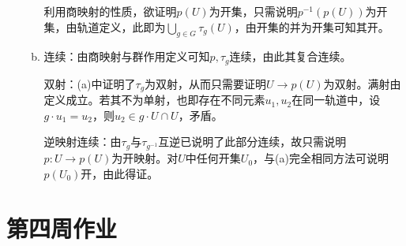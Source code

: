 \documentclass[a4paper,UTF8,fontset=windows]{ctexart}
\begin{document}
\begin{enumerate}[(1)]
\begin{enumerate}[(a)]
    利用商映射的性质，欲证明$p(U)$为开集，只需说明$p^{-1}(p(U))$为开集，由轨道定义，此即为$\bigcup_{g\in G}\tau_g(U)$，由开集的并为开集可知其开。
    
    \item
    连续：由商映射与群作用定义可知$p,\tau_g$连续，由此其复合连续。
    
    双射：(a)中证明了$\tau_g$为双射，从而只需要证明$U\to p(U)$为双射。满射由定义成立。若其不为单射，也即存在不同元素$u_1,u_2$在同一轨道中，设$g\cdot u_1=u_2$，则$u_2\in g\cdot U\cap U$，矛盾。
    
    逆映射连续：由$\tau_g$与$\tau_{g^{-1}}$互逆已说明了此部分连续，故只需说明$p:U\to p(U)$为开映射。对$U$中任何开集$U_0$，与(a)完全相同方法可说明$p(U_0)$开，由此得证。
    \end{enumerate}
\end{enumerate}

\section{第四周作业}
\end{document}
